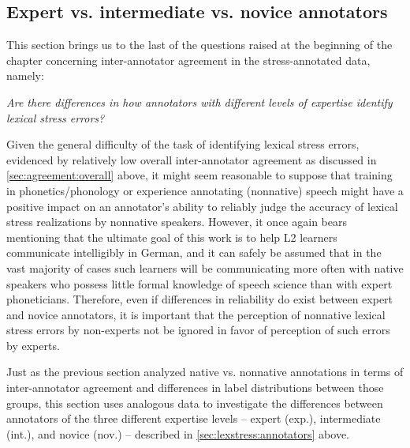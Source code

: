 		
		\subsection{Expert vs. intermediate vs. novice annotators}
		\label{sec:agreement:expert}
		
		
		
	This section brings us to the last of the questions raised at the beginning of the chapter concerning inter-annotator agreement in the stress-annotated data, namely:
	
	\textit{Are there differences in how 
	annotators with different levels of expertise
	identify lexical stress errors?}
	
	Given the general difficulty of the task of identifying lexical stress errors, evidenced by relatively low overall inter-annotator agreement as discussed in \cref{sec:agreement:overall} above, it might seem reasonable to suppose that training in phonetics/phonology or experience annotating (nonnative) speech might have a positive impact on an annotator's ability to reliably judge the accuracy of lexical stress realizations by nonnative speakers. However, it once again bears mentioning that the ultimate goal of this work is to help L2 learners communicate intelligibly in German, and it can safely be assumed that in the vast majority of cases such learners will be communicating more often with native speakers who possess little formal knowledge of speech science than with expert phoneticians. Therefore, even if differences in reliability do exist between expert and novice annotators, it is important that the perception of nonnative lexical stress errors by non-experts not be ignored in favor of perception of such errors by experts. 
	

	
	Just as the previous section analyzed native vs. nonnative annotations in terms of inter-annotator agreement and differences in label distributions between those groups, this section uses analogous data to investigate the differences between annotators of the three different expertise levels -- expert (exp.), intermediate (int.), and novice (nov.) -- described in \cref{sec:lexstress:annotators} above.
	
